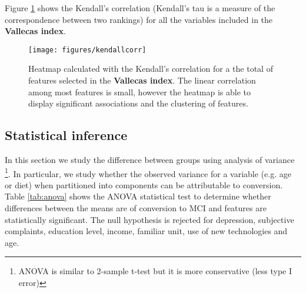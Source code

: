 \documentclass[11pt]{article}
\theoremstyle{definition}
\theoremstyle{remark}
\begin{document}
Figure \ref{fig:kendall} shows the Kendall's correlation (Kendall’s tau is a measure of the correspondence between two rankings) 
for all the variables included in the \textbf{Vallecas index}.

\begin{figure}[h!]
        \centering
        \texttt{[image: figures/kendallcorr]}
        \caption{Heatmap calculated with the Kendall's correlation for a the total of features selected in the \textbf{Vallecas index}.
        The linear correlation among most features is small, however the heatmap is able to display significant associations and the clustering of features.} \label{fig:kendall}
\end{figure}

\subsection{Statistical inference}
\label{sse:satinf}
In this section we study the difference between groups using analysis of variance \footnote{ANOVA is similar to 2-sample t-test but it is more conservative (less type I error)}. In particular, we study whether the observed variance for a variable (e.g. age or diet) when partitioned into components can be attributable to conversion.
Table \ref{tab:anova} shows the ANOVA statistical test to determine whether differences between the means are of conversion to MCI and features are statistically significant. The null hypothesis is rejected for depression,  subjective complaints, education level, income, familiar unit, use of new technologies and age.
\end{document}
